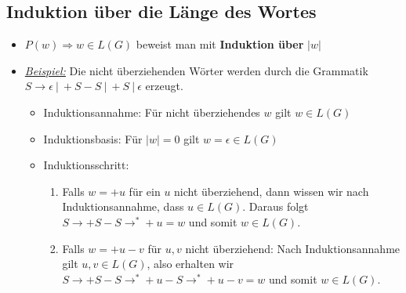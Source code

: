 \documentclass[ieeetran]{article}
\begin{document}
\subsection{Induktion über die Länge des Wortes} %
\label{sub:induktion_über_die_länge_des_wortes}
\begin{itemize}
	\item $P(w) \Longrightarrow w \in L(G)$ beweist man mit \textbf{Induktion über }$|w|$
	\item \textit{\underline{Beispiel:}} Die nicht überziehenden Wörter werden durch die Grammatik $S \rightarrow \epsilon \ | \ +S-S \ | \ +S \ | \ \epsilon$ erzeugt.
		\begin{itemize}
		\item Induktionsannahme: Für nicht überziehendes $w$ gilt $w \in L(G)$
		  \item Induktionsbasis: Für $|w| = 0$ gilt $w = \epsilon \in L(G)$
\item Induktionsschritt:
	\begin{enumerate}
	  \item Falls $w = +u$ für ein $u$ nicht überziehend, dann wissen wir nach Induktionsannahme, dass $u \in L(G)$. Daraus folgt $S \rightarrow +S-S \rightarrow^* +u = w$ und somit $w \in L(G)$.
	\item Falls $w = +u-v$ für $u,v$ nicht überziehend: Nach Induktionsannahme gilt $u,v \in L(G)$, also erhalten wir $S \rightarrow +S-S \rightarrow^*+u-S \rightarrow^* +u-v = w$ und somit $w \in L(G)$.
	\end{enumerate}
		\end{itemize}
\end{itemize}
\end{document}
